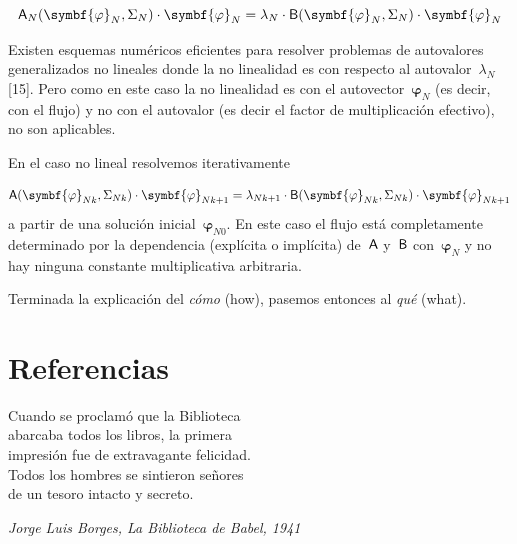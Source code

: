 \documentclass[
  12pt,
  a4paper,
  table]{scrbook}
\theoremstyle{plain}
\theoremstyle{definition}
\theoremstyle{plain}
\theoremstyle{plain}
\theoremstyle{remark}
\begin{document}
\[
\mat{A}_N(\symbf{\varphi}_N,\Sigma_N) \cdot \symbf{\varphi}_N = \lambda_N \cdot \mat{B}(\symbf{\varphi}_N,\Sigma_N) \cdot \symbf{\varphi}_N
\]

Existen esquemas numéricos eficientes para resolver problemas de
autovalores generalizados no lineales donde la no linealidad es con
respecto al autovalor~\(\lambda_N\) {[}15{]}. Pero como en este caso la
no linealidad es con el autovector~\(\symbf{\varphi}_N\) (es decir, con
el flujo) y no con el autovalor (es decir el factor de multiplicación
efectivo), no son aplicables.

En el caso no lineal resolvemos iterativamente

\[
\mat{A}(\symbf{\varphi}_{Nk},\Sigma_{Nk}) \cdot \symbf{\varphi}_{Nk+1} = \lambda_{Nk+1} \cdot \mat{B}(\symbf{\varphi}_{Nk},\Sigma_{Nk}) \cdot \symbf{\varphi}_{Nk+1}
\] a partir de una solución inicial~\(\symbf{\varphi}_{N0}\). En este
caso el flujo está completamente determinado por la dependencia
(explícita o implícita) de~\(\mathsf{A}\) y~\(\mathsf{B}\)
con~\(\symbf{\varphi}_N\) y no hay ninguna constante multiplicativa
arbitraria.

Terminada la explicación del \emph{cómo}
(\foreignlanguage{american}{how}), pasemos entonces al \emph{qué}
(\foreignlanguage{american}{what}).


\hypertarget{referencias}{%
\chapter*{Referencias}\label{referencias}}


\begin{chapterquote}

Cuando se proclamó que la Biblioteca\\
abarcaba todos los libros, la primera\\
impresión fue de extravagante felicidad.\\
Todos los hombres se sintieron señores\\
de un tesoro intacto y secreto.

\smallskip

\emph{Jorge Luis Borges, La Biblioteca de Babel, 1941}

\end{chapterquote}
\end{document}
